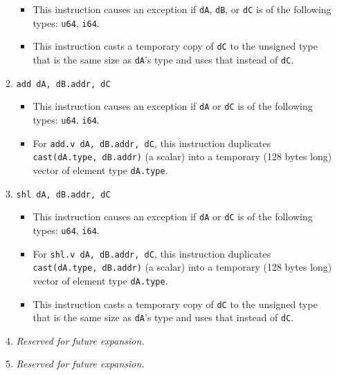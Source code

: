 \documentclass{article}
\begin{document}
\begin{itemize}
\begin{enumerate}
\begin{itemize}
				\item This instruction causes an exception if \texttt{dA},
				\texttt{dB}, or \texttt{dC} is of the following types:
				\texttt{u64}, \texttt{i64}.

				\item This instruction casts a temporary copy of
				\texttt{dC} to the unsigned type that is the same size as
				\texttt{dA}'s type and uses that instead of \texttt{dC}.
				\end{itemize}

			\item \texttt{add dA, dB.addr, dC}
				\begin{itemize}
				\item This instruction causes an exception if \texttt{dA}
				or \texttt{dC} is of the following types: \texttt{u64},
				\texttt{i64}.

				\item For \texttt{add.v dA, dB.addr, dC}, this instruction
				duplicates \texttt{cast(dA.type, dB.addr)} (a scalar) into
				a temporary (128 bytes long) vector of element type
				\texttt{dA.type}.
				\end{itemize}
			\item \texttt{shl dA, dB.addr, dC}
				\begin{itemize}
				\item This instruction causes an exception if \texttt{dA}
				or \texttt{dC} is of the following types: \texttt{u64},
				\texttt{i64}.

				\item For \texttt{shl.v dA, dB.addr, dC}, this instruction
				duplicates \texttt{cast(dA.type, dB.addr)} (a scalar) into
				a temporary (128 bytes long) vector of element type
				\texttt{dA.type}.

				\item This instruction casts a temporary copy of
				\texttt{dC} to the unsigned type that is the same size as
				\texttt{dA}'s type and uses that instead of \texttt{dC}.
				\end{itemize}
			\item \textit{Reserved for future expansion.}
			\item \textit{Reserved for future expansion.}
			\end{enumerate}
		\end{itemize}
		\newpage
\end{document}
